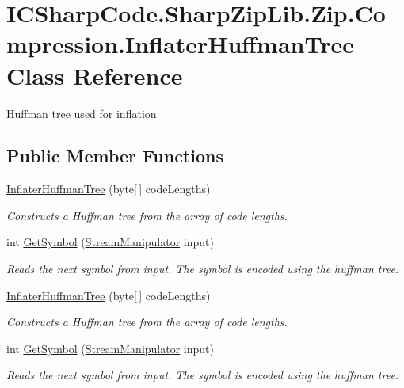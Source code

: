 \hypertarget{class_i_c_sharp_code_1_1_sharp_zip_lib_1_1_zip_1_1_compression_1_1_inflater_huffman_tree}{}\section{I\+C\+Sharp\+Code.\+Sharp\+Zip\+Lib.\+Zip.\+Compression.\+Inflater\+Huffman\+Tree Class Reference}
\label{class_i_c_sharp_code_1_1_sharp_zip_lib_1_1_zip_1_1_compression_1_1_inflater_huffman_tree}


Huffman tree used for inflation  


\subsection*{Public Member Functions}
\begin{DoxyCompactItemize}
\item 
\hyperlink{class_i_c_sharp_code_1_1_sharp_zip_lib_1_1_zip_1_1_compression_1_1_inflater_huffman_tree_a75f3f45273de2a95bb3f3ea01447c382}{Inflater\+Huffman\+Tree} (byte\mbox{[}$\,$\mbox{]} code\+Lengths)
\begin{DoxyCompactList}\small\item\em Constructs a Huffman tree from the array of code lengths. \end{DoxyCompactList}\item 
int \hyperlink{class_i_c_sharp_code_1_1_sharp_zip_lib_1_1_zip_1_1_compression_1_1_inflater_huffman_tree_a2502c53f425e721c34ccfee00355ae3a}{Get\+Symbol} (\hyperlink{class_i_c_sharp_code_1_1_sharp_zip_lib_1_1_zip_1_1_compression_1_1_streams_1_1_stream_manipulator}{Stream\+Manipulator} input)
\begin{DoxyCompactList}\small\item\em Reads the next symbol from input. The symbol is encoded using the huffman tree. \end{DoxyCompactList}\item 
\hyperlink{class_i_c_sharp_code_1_1_sharp_zip_lib_1_1_zip_1_1_compression_1_1_inflater_huffman_tree_a75f3f45273de2a95bb3f3ea01447c382}{Inflater\+Huffman\+Tree} (byte\mbox{[}$\,$\mbox{]} code\+Lengths)
\begin{DoxyCompactList}\small\item\em Constructs a Huffman tree from the array of code lengths. \end{DoxyCompactList}\item 
int \hyperlink{class_i_c_sharp_code_1_1_sharp_zip_lib_1_1_zip_1_1_compression_1_1_inflater_huffman_tree_a2502c53f425e721c34ccfee00355ae3a}{Get\+Symbol} (\hyperlink{class_i_c_sharp_code_1_1_sharp_zip_lib_1_1_zip_1_1_compression_1_1_streams_1_1_stream_manipulator}{Stream\+Manipulator} input)
\begin{DoxyCompactList}\small\item\em Reads the next symbol from input. The symbol is encoded using the huffman tree. \end{DoxyCompactList}\end{DoxyCompactItemize}
